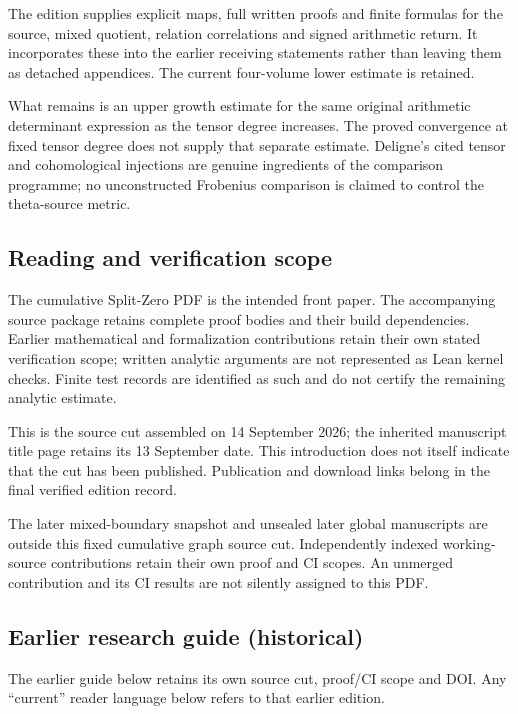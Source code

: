 \documentclass[
]{article}
\begin{document}
The edition supplies explicit maps, full written proofs and finite
formulas for the source, mixed quotient, relation correlations and
signed arithmetic return. It incorporates these into the earlier
receiving statements rather than leaving them as detached appendices.
The current four-volume lower estimate is retained.

What remains is an upper growth estimate for the same original
arithmetic determinant expression as the tensor degree increases. The
proved convergence at fixed tensor degree does not supply that separate
estimate. Deligne's cited tensor and cohomological injections are
genuine ingredients of the comparison programme; no unconstructed
Frobenius comparison is claimed to control the theta-source metric.

\subsection{Reading and verification
scope}\label{reading-and-verification-scope-2}

The cumulative Split-Zero PDF is the intended front paper. The
accompanying source package retains complete proof bodies and their
build dependencies. Earlier mathematical and formalization contributions
retain their own stated verification scope; written analytic arguments
are not represented as Lean kernel checks. Finite test records are
identified as such and do not certify the remaining analytic estimate.

This is the source cut assembled on 14 September 2026; the inherited
manuscript title page retains its 13 September date. This introduction
does not itself indicate that the cut has been published. Publication
and download links belong in the final verified edition record.

The later mixed-boundary snapshot and unsealed later global manuscripts
are outside this fixed cumulative graph source cut. Independently
indexed working-source contributions retain their own proof and CI
scopes. An unmerged contribution and its CI results are not silently
assigned to this PDF.

\subsection{Earlier research guide
(historical)}\label{earlier-research-guide-historical}

The earlier guide below retains its own source cut, proof/CI scope and
DOI. Any ``current'' reader language below refers to that earlier
edition.
\end{document}
